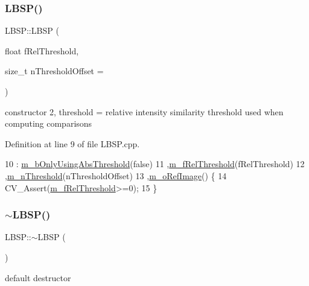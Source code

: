 \subsubsection{\texorpdfstring{L\+B\+S\+P()}{LBSP()}\hspace{0.1cm}{\footnotesize\ttfamily [2/2]}}
{\footnotesize\ttfamily L\+B\+S\+P\+::\+L\+B\+SP (\begin{DoxyParamCaption}\item[{float}]{f\+Rel\+Threshold,  }\item[{size\+\_\+t}]{n\+Threshold\+Offset = {} }\end{DoxyParamCaption})}



constructor 2, threshold = relative intensity \textquotesingle{}similarity\textquotesingle{} threshold used when computing comparisons 



Definition at line 9 of file L\+B\+S\+P.\+cpp.


\begin{DoxyCode}
10     :    \mbox{\hyperlink{class_l_b_s_p_a5f49537c70502b73f32038218a4f8371}{m\_bOnlyUsingAbsThreshold}}(\textcolor{keyword}{false})
11         ,\mbox{\hyperlink{class_l_b_s_p_a99fbb83c842782bb5621a43efb7580d5}{m\_fRelThreshold}}(fRelThreshold)
12         ,\mbox{\hyperlink{class_l_b_s_p_aa1c90eb308a5ff277df09c4da186693a}{m\_nThreshold}}(nThresholdOffset)
13         ,\mbox{\hyperlink{class_l_b_s_p_a8c5ccb37124c8fa457db0ba9dbe28c18}{m\_oRefImage}}() \{
14     CV\_Assert(\mbox{\hyperlink{class_l_b_s_p_a99fbb83c842782bb5621a43efb7580d5}{m\_fRelThreshold}}>=0);
15 \}
\end{DoxyCode}
\mbox{\label{class_l_b_s_p_ad1a391995cbb0cfbb7289c73a6d37bc6}} 
\subsubsection{\texorpdfstring{$\sim$\+L\+B\+S\+P()}{~LBSP()}}
{\footnotesize\ttfamily L\+B\+S\+P\+::$\sim$\+L\+B\+SP (\begin{DoxyParamCaption}{ }\end{DoxyParamCaption})\hspace{0.3cm}{\ttfamily [virtual]}}



default destructor 



